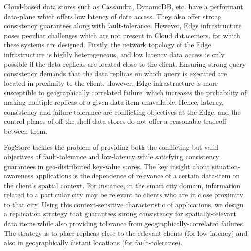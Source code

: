 \par Cloud-based data stores such as Cassandra, DynamoDB, etc. have a performant data-plane which offers low latency of data access. They also offer strong consistency guarantees along with fault-tolerance. However, Edge infrastructure poses peculiar challenges which are not present in Cloud datacenters, for which these systems are designed. Firstly, the network topology of the Edge infrastructure is highly heterogeneous, and low latency data access is only possible if the data replicas are located close to the client. Ensuring strong query consistency demands that the data replicas on which query is executed are located in proximity to the client. However, Edge infrastructure is more susceptible to geographically correlated failure, which increases the probability of making multiple replicas of a given data-item unavailable. Hence, latency, consistency and failure tolerance are conflicting objectives at the Edge, and the control-planes of off-the-shelf data stores do not offer a reasonable tradeoff between them. 
\par FogStore tackles the problem of providing both the conflicting but valid objectives of fault-tolerance and low-latency while satisfying consistency guarantees in geo-distributed key-value stores. The key insight about situation-awareness applications is the dependence of relevance of a certain data-item on the client's spatial context. For instance, in the smart city domain, information related to a particular city may be relevant to clients who are in close proximity to that city. Using this context-sensitive characteristic of applications, we design a replication strategy that guarantees strong consistency for spatially-relevant data items while also providing tolerance from geographically-correlated failures.  
The strategy is to place replicas close to the relevant clients (for low latency) and also in geographically distant locations (for fault-tolerance).

